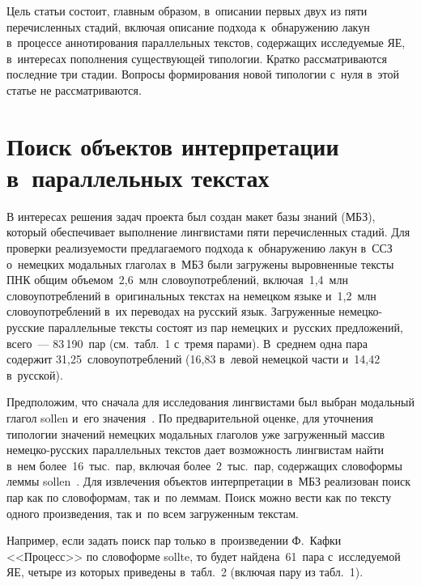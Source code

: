 \begin{multicols}{2}
  Цель статьи состоит, главным образом, в~описании первых двух из пяти 
перечисленных стадий, включая описание подхода к~обнаружению лакун 
в~процессе аннотирования параллельных текстов, содержащих исследуемые 
ЯЕ, в~интересах пополнения существующей типологии. Кратко 
рас\-смат\-ри\-ва\-ют\-ся последние три стадии. Вопросы формирования новой 
типологии с~нуля в~этой статье не рассматриваются.

\vspace*{-6pt}

\section{Поиск объектов интерпретации в~параллельных текстах}
    
  В интересах решения задач проекта был создан макет базы знаний (МБЗ), 
который обеспечивает выполнение лингвистами пяти перечисленных стадий. 
Для проверки реализуемости предлагаемого подхода к~обнаружению лакун 
в~ССЗ о~немецких модальных глаголах в~МБЗ были загружены выровненные 
тексты ПНК общим объемом~2,6~млн словоупотреблений, включая~1,4~млн 
сло\-во\-упо\-треб\-ле\-ний в~оригинальных текстах на немецком языке и~1,2~млн 
сло\-во\-упо\-треб\-ле\-ний в~их переводах на русский язык. Загруженные 
не\-мец\-ко-рус\-ские параллельные тексты состоят из пар немецких и~русских предложений, 
всего~--- 83\,190~пар (см.\ табл.~1 с~тремя парами). В~среднем одна пара 
содержит 31,25~сло\-во\-упо\-треб\-ле\-ний (16,83 в~левой немецкой части и~14,42 
в~русской). 
  
  Предположим, что сначала для исследования лингвистами был выбран 
модальный глагол sollen и~его значения~\cite{9-zat}. По предварительной 
оценке, для уточнения типологии значений немецких модальных глаголов уже 
загруженный массив не\-мец\-ко-рус\-ских параллельных текстов дает возможность 
лингвистам найти в~нем более~16~тыс.\ пар, включая более~2~тыс.\ пар, 
содержащих словоформы леммы sollen~\cite{10-zat}. Для извлечения объектов 
интерпретации в~МБЗ реализован поиск пар как по словоформам, так и~по 
леммам. Поиск можно вести как по тексту одного произведения, так и~по всем 
загруженным текстам.
  
  Например, если задать поиск пар только в~произведении Ф.~Кафки 
<<Процесс>> по словоформе sollte, то будет найдена~61~пара с~исследуемой 
ЯЕ, четыре из которых приведены в~табл.~2 (включая пару из табл.~1).
  


\end{multicols}

